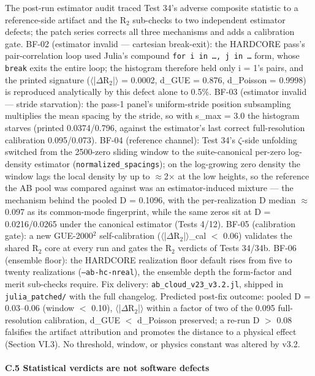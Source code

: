 \documentclass[10pt]{article}
\begin{document}
The post-run estimator audit traced Test 34's adverse composite statistic to a reference-side artifact and the R$_2$ sub-checks to two independent estimator defects; the patch series corrects all three mechanisms and adds a calibration gate. BF-02 (estimator invalid --- cartesian break-exit): the HARDCORE pass's pair-correlation loop used Julia's compound \texttt{for i in \ldots{}, j in \ldots{}} form, whose \texttt{break} exits the entire loop; the histogram therefore held only i = 1's pairs, and the printed signature ($\langle$|$\Delta$R$_2$|$\rangle$ = 0.0002, d\_GUE = 0.876, d\_Poisson = 0.9998) is reproduced analytically by this defect alone to 0.5\%. BF-03 (estimator invalid --- stride starvation): the pass-1 panel's uniform-stride position subsampling multiplies the mean spacing by the stride, so with s\_max = 3.0 the histogram starves (printed 0.0374/0.796, against the estimator's last correct full-resolution calibration 0.095/0.073). BF-04 (reference channel): Test 34's $\zeta$-side unfolding switched from the 2500-zero sliding window to the suite-canonical per-zero log-density estimator (\texttt{normalized\_spacings}); on the log-growing zero density the window lags the local density by up to $\approx$2$\times$ at the low heights, so the reference the AB pool was compared against was an estimator-induced mixture --- the mechanism behind the pooled D = 0.1096, with the per-realization D median $\approx$ 0.097 as its common-mode fingerprint, while the same zeros sit at D = 0.0216/0.0265 under the canonical estimator (Tests 4/12). BF-05 (calibration gate): a new GUE-2000$^2$ self-calibration ($\langle$|$\Delta$R$_2$|$\rangle$\_cal $<$ 0.06) validates the shared R$_2$ core at every run and gates the R$_2$ verdicts of Tests 34/34b. BF-06 (ensemble floor): the HARDCORE realization floor default rises from five to twenty realizations (\texttt{--ab-hc-nreal}), the ensemble depth the form-factor and merit sub-checks require. Fix delivery: \texttt{ab\_cloud\_v23\_v3.2.jl}, shipped in \texttt{julia\_patched/} with the full changelog. Predicted post-fix outcome: pooled D = 0.03--0.06 (window $<$ 0.10), $\langle$|$\Delta$R$_2$|$\rangle$ within a factor of two of the 0.095 full-resolution calibration, d\_GUE $<$ d\_Poisson preserved; a re-run D $>$ 0.08 falsifies the artifact attribution and promotes the distance to a physical effect (Section VI.3). No threshold, window, or physics constant was altered by v3.2.

\paragraph{C.5 Statistical verdicts are not software defects}
\end{document}
